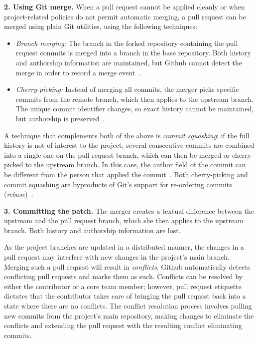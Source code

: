 \documentclass{sig-alternate}
\begin{document}
\textbf{2. Using Git merge.} When a pull request cannot be applied cleanly or
    when project-related policies do not permit automatic merging, a pull
    request can be merged using plain Git utilities, using the following
    techniques: 

    \begin{itemize}

      \item \emph{Branch merging:} The branch in the forked repository
        containing the pull request commits is merged into a branch in the base
        repository. Both history and authorship information are maintained, but
        Github cannot detect the merge in order to record a merge
        event~\cite[Chapter 3.2]{Chaco09}. 

      \item \emph{Cherry-picking:} Instead of merging all commits, the merger
        picks specific commits from the remote branch, which then applies to the
        upstream branch. The unique commit identifier changes, so exact history
        cannot be maintained, but authorship is 
        preserved~\cite[Chapter 5.3]{Chaco09}.
    
    \end{itemize}

    A technique that complements both of the above is \emph{commit
    squa\-shing}: if the full history is not of interest to the project,
    several consecutive commits are combined into a single one on the pull request
    branch, which can then be merged or cherry-picked to the upstream branch. In
    this case, the author field of the commit can be different from the person that
    applied the commit~\cite[Chapter 6.4]{Chaco09}. Both cherry-picking and
    commit squashing are byproducts of Git's support for re-ordering commits
    (\emph{rebase})~\cite[Chapter 3.6]{Chaco09}.

\textbf{3. Committing the patch.} 
  The merger creates a textual difference between the upstream and the pull
  request branch, which she then applies to the upstream branch. Both history and
  authorship information are lost.

As the project branches are updated in a distributed manner, the changes in a
pull request may interfere with new changes in the project's main branch.
Merging such a pull request will result in \emph{conflicts}. Github
automatically detects conflicting pull requests and marks them as such.
Conflicts can be resolved by either the contributor or a core team member;
however, pull request etiquette dictates that the contributor takes care of
bringing the pull request back into a state where there are no conflicts. The
conflict resolution process involves pulling new commits from the project's main
repository, making changes to eliminate the conflicts and
extending the pull request with the resulting conflict eliminating commits.
\end{document}
